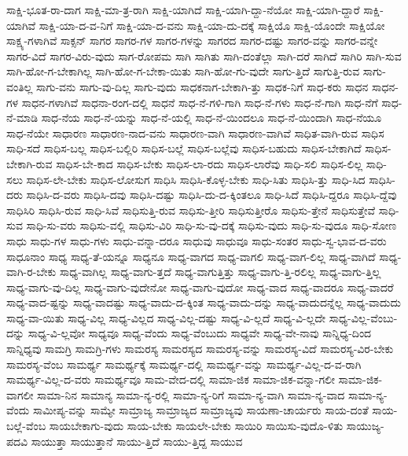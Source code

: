 {ಸಾಕ್ಷಿ-ಭೂತ-ರಾ-ದಾಗ
ಸಾಕ್ಷಿ-ಮಾ-ತ್ರ-ರಾಗಿ
ಸಾಕ್ಷಿ-ಯಾಗಿದೆ
ಸಾಕ್ಷಿ-ಯಾಗಿ-ದ್ದಾ-ನೆಯೋ
ಸಾಕ್ಷಿ-ಯಾಗಿ-ದ್ದಾರೆ
ಸಾಕ್ಷಿ-ಯಾಗಿವೆ
ಸಾಕ್ಷಿ-ಯಾ-ದ-ವ-ನಿಗೆ
ಸಾಕ್ಷಿ-ಯಾ-ದ-ವನು
ಸಾಕ್ಷಿ-ಯಾ-ದು-ದಕ್ಕೆ
ಸಾಕ್ಷಿಯೊ
ಸಾಕ್ಷಿ-ಯೊಂದೇ
ಸಾಕ್ಷಿಯೋ
ಸಾಕ್ಷ್ಯ-ಗಳಾಗಿವೆ
ಸಾಕ್ಸನ್
ಸಾಗರ
ಸಾಗರ-ಗಳ
ಸಾಗರ-ಗಳನ್ನು
ಸಾಗರದ
ಸಾಗರ-ದಷ್ಟು
ಸಾಗರ-ವನ್ನು
ಸಾಗರ-ವನ್ನೇ
ಸಾಗರ-ವಿದೆ
ಸಾಗರ-ವಿರು-ವುದು
ಸಾಗ-ರೋಪಮ
ಸಾಗಿ
ಸಾಗಿತು
ಸಾಗಿ-ದಂತೆಲ್ಲಾ
ಸಾಗಿ-ದರೆ
ಸಾಗಿದೆ
ಸಾಗಿರಿ
ಸಾಗಿ-ಸುವ
ಸಾಗಿ-ಹೋ-ಗ-ಬೇಕಾಗಿಲ್ಲ
ಸಾಗಿ-ಹೋ-ಗ-ಬೇಕಾ-ಯಿತು
ಸಾಗಿ-ಹೋ-ಗು-ವುದೇ
ಸಾಗು-ತ್ತಿದೆ
ಸಾಗುತ್ತಿ-ರುವ
ಸಾಗು-ವಂತಿಲ್ಲ
ಸಾಗು-ವನು
ಸಾಗು-ವು-ದಿಲ್ಲ
ಸಾಗು-ವುದು
ಸಾಧಕನಾಗ-ಬೇಕಾಗಿ-ತ್ತು
ಸಾಧಕ-ನಿಗೆ
ಸಾಧ-ಕರು
ಸಾಧನ
ಸಾಧನ-ಗಳ
ಸಾಧನ-ಗಳಾಗಿವೆ
ಸಾಧನಾ-ರಂಗ-ದಲ್ಲಿ
ಸಾಧನೆ
ಸಾಧ-ನೆ-ಗಳಿ-ಗಾಗಿ
ಸಾಧ-ನೆ-ಗಳು
ಸಾಧ-ನೆ-ಗಾಗಿ
ಸಾಧ-ನೆಗೆ
ಸಾಧ-ನೆ-ಮಾಡಿ
ಸಾಧ-ನೆಯ
ಸಾಧ-ನೆ-ಯನ್ನು
ಸಾಧ-ನೆ-ಯಲ್ಲಿ
ಸಾಧ-ನೆ-ಯಿಂದಲೂ
ಸಾಧ-ನೆ-ಯಿಂದಾಗಿ
ಸಾಧ-ನೆಯೂ
ಸಾಧ-ನೆಯೇ
ಸಾಧಾರಣ
ಸಾಧಾರಣ-ನಾದ-ವನು
ಸಾಧಾರಣ-ವಾಗಿ
ಸಾಧಾರಣ-ವಾಗಿವೆ
ಸಾಧಿತ-ವಾಗಿ-ರುವ
ಸಾಧಿಸ
ಸಾಧಿ-ಸದೆ
ಸಾಧಿಸ-ಬಲ್ಲ
ಸಾಧಿಸ-ಬಲ್ಲಿರಿ
ಸಾಧಿಸ-ಬಲ್ಲೆ
ಸಾಧಿಸ-ಬಲ್ಲೆವು
ಸಾಧಿಸ-ಬಹುದು
ಸಾಧಿಸ-ಬೇಕಾಗಿದೆ
ಸಾಧಿಸ-ಬೇಕಾಗಿ-ರುವ
ಸಾಧಿಸ-ಬೇ-ಕಾದ
ಸಾಧಿಸ-ಬೇಕು
ಸಾಧಿಸ-ಲಾ-ರದು
ಸಾಧಿಸ-ಲಾರೆವು
ಸಾಧಿ-ಸಲಿ
ಸಾಧಿಸ-ಲಿಲ್ಲ
ಸಾಧಿ-ಸಲು
ಸಾಧಿಸ-ಲೇ-ಬೇಕು
ಸಾಧಿಸ-ಲೋಸುಗ
ಸಾಧಿಸಿ
ಸಾಧಿಸಿ-ಕೊಳ್ಳ-ಬೇಕು
ಸಾಧಿ-ಸಿತು
ಸಾಧಿಸಿ-ತ್ತು
ಸಾಧಿ-ಸಿದ
ಸಾಧಿಸಿ-ದರು
ಸಾಧಿಸಿ-ದ-ವರು
ಸಾಧಿಸಿ-ದವು
ಸಾಧಿಸಿ-ದಷ್ಟು
ಸಾಧಿಸಿ-ದು-ದ-ಕ್ಕಿಂತಲೂ
ಸಾಧಿ-ಸಿದೆ
ಸಾಧಿಸಿ-ದ್ದರೂ
ಸಾಧಿಸಿ-ದ್ದೆವು
ಸಾಧಿಸಿರಿ
ಸಾಧಿಸಿ-ರುವ
ಸಾಧಿ-ಸಿವೆ
ಸಾಧಿಸುತ್ತಿ-ರುವ
ಸಾಧಿಸು-ತ್ತೀರಿ
ಸಾಧಿಸುತ್ತೀರೊ
ಸಾಧಿಸು-ತ್ತೇನೆ
ಸಾಧಿಸುತ್ತೇವೆ
ಸಾಧಿ-ಸುವ
ಸಾಧಿ-ಸು-ವರು
ಸಾಧಿಸು-ವಲ್ಲಿ
ಸಾಧಿಸು-ವಿರಿ
ಸಾಧಿ-ಸು-ವು-ದಕ್ಕೆ
ಸಾಧಿಸು-ವುದು
ಸಾಧಿ-ಸು-ವುದೂ
ಸಾಧಿ-ಸೋಣ
ಸಾಧು
ಸಾಧು-ಗಳ
ಸಾಧು-ಗಳು
ಸಾಧು-ವನ್ನಾ-ದರೂ
ಸಾಧುವು
ಸಾಧುವೂ
ಸಾಧು-ಸಂತರ
ಸಾಧು-ಸ್ವ-ಭಾವ-ದ-ವರು
ಸಾಧೂನಾಂ
ಸಾಧ್ಯ
ಸಾಧ್ಯ-ತೆ-ಯನ್ನೂ
ಸಾಧ್ಯನೂ
ಸಾಧ್ಯ-ವಾಗದ
ಸಾಧ್ಯ-ವಾಗಲಿ
ಸಾಧ್ಯ-ವಾಗ-ಲಿಲ್ಲ
ಸಾಧ್ಯ-ವಾಗಿದೆ
ಸಾಧ್ಯ-ವಾಗಿ-ರ-ಬೇಕು
ಸಾಧ್ಯ-ವಾಗಿಲ್ಲ
ಸಾಧ್ಯ-ವಾಗು-ತ್ತದೆ
ಸಾಧ್ಯ-ವಾಗುತ್ತಿತ್ತು
ಸಾಧ್ಯ-ವಾಗು-ತ್ತಿ-ರಲಿಲ್ಲ
ಸಾಧ್ಯ-ವಾಗು-ತ್ತಿಲ್ಲ
ಸಾಧ್ಯ-ವಾಗು-ವು-ದಿಲ್ಲ
ಸಾಧ್ಯ-ವಾಗು-ವುದೇನೋ
ಸಾಧ್ಯ-ವಾಗು-ವುದೋ
ಸಾಧ್ಯ-ವಾದ
ಸಾಧ್ಯ-ವಾದರೂ
ಸಾಧ್ಯ-ವಾದರೆ
ಸಾಧ್ಯ-ವಾದ-ಷ್ಟನ್ನು
ಸಾಧ್ಯ-ವಾದಷ್ಟು
ಸಾಧ್ಯ-ವಾದು-ದ-ಕ್ಕಿಂತ
ಸಾಧ್ಯ-ವಾದು-ದನ್ನು
ಸಾಧ್ಯ-ವಾದುದನ್ನೆಲ್ಲ
ಸಾಧ್ಯ-ವಾದುದು
ಸಾಧ್ಯ-ವಾ-ಯಿತು
ಸಾಧ್ಯ-ವಿಲ್ಲ
ಸಾಧ್ಯ-ವಿಲ್ಲದ
ಸಾಧ್ಯ-ವಿಲ್ಲ-ದಷ್ಟು
ಸಾಧ್ಯ-ವಿ-ಲ್ಲದೆ
ಸಾಧ್ಯ-ವಿ-ಲ್ಲದೇ
ಸಾಧ್ಯ-ವಿಲ್ಲ-ವೆಂಬು-ದನ್ನು
ಸಾಧ್ಯ-ವಿ-ಲ್ಲವೋ
ಸಾಧ್ಯವೂ
ಸಾಧ್ಯ-ವೆಂದು
ಸಾಧ್ಯ-ವೆಂಬುದು
ಸಾಧ್ಯವೇ
ಸಾಧ್ಯ-ವೇ-ನಾವು
ಸಾನ್ನಿಧ್ಯ-ದಿಂದ
ಸಾನ್ನಿಧ್ಯವು
ಸಾಮಗ್ರಿ
ಸಾಮಗ್ರಿ-ಗಳು
ಸಾಮರಸ್ಯ
ಸಾಮರಸ್ಯದ
ಸಾಮರಸ್ಯ-ವನ್ನು
ಸಾಮರಸ್ಯ-ವಿದೆ
ಸಾಮರಸ್ಯ-ವಿರ-ಬೇಕು
ಸಾಮರಸ್ಯ-ವೆಂಬ
ಸಾಮರ್ಥ್ಯ
ಸಾಮರ್ಥ್ಯಕ್ಕೆ
ಸಾಮರ್ಥ್ಯ-ದಲ್ಲಿ
ಸಾಮರ್ಥ್ಯ-ವನ್ನು
ಸಾಮರ್ಥ್ಯ-ವಿಲ್ಲ-ದ-ವ-ರಾಗಿ
ಸಾಮರ್ಥ್ಯ-ವಿಲ್ಲ-ದ-ವರು
ಸಾಮರ್ಥ್ಯವೂ
ಸಾಮ-ವೇದ-ದಲ್ಲಿ
ಸಾಮಾ-ಜಿಕ
ಸಾಮಾ-ಜಿಕ-ವನ್ನಾ-ಗಲೀ
ಸಾಮಾ-ಜಿಕ-ವಾಗಲೀ
ಸಾಮಾ-ನಿನ
ಸಾಮಾನ್ಯ
ಸಾಮಾ-ನ್ಯ-ರಲ್ಲಿ
ಸಾಮಾ-ನ್ಯ-ರಿಗೆ
ಸಾಮಾ-ನ್ಯ-ವಾಗಿ
ಸಾಮಾ-ನ್ಯ-ವಾದ
ಸಾಮಾ-ನ್ಯ-ವೆಂದು
ಸಾಮೀಪ್ಯ-ವನ್ನು
ಸಾಮ್ಯೇ
ಸಾಮ್ರಾಜ್ಯ
ಸಾಮ್ರಾಜ್ಯದ
ಸಾಮ್ರಾಜ್ಯವು
ಸಾಯಣಾ-ಚಾರ್ಯರು
ಸಾಯ-ದಂತೆ
ಸಾಯ-ಬಲ್ಲೆ-ವೆಂಬ
ಸಾಯಬೇಕಾಗು-ವುದು
ಸಾಯ-ಬೇಕು
ಸಾಯಲೇ-ಬೇಕು
ಸಾಯಿರಿ
ಸಾಯಿಸು-ವುದೊ-ಳಿತು
ಸಾಯುಜ್ಯ-ಪದವಿ
ಸಾಯುತ್ತಾ
ಸಾಯುತ್ತಾನೆ
ಸಾಯು-ತ್ತಿದೆ
ಸಾಯು-ತ್ತಿದ್ದ
ಸಾಯುವ
}
